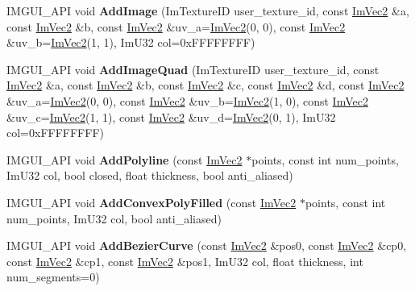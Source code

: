 \begin{DoxyCompactItemize}
I\+M\+G\+U\+I\+\_\+\+A\+PI void {\bfseries Add\+Image} (Im\+Texture\+ID user\+\_\+texture\+\_\+id, const \hyperlink{struct_im_vec2}{Im\+Vec2} \&a, const \hyperlink{struct_im_vec2}{Im\+Vec2} \&b, const \hyperlink{struct_im_vec2}{Im\+Vec2} \&uv\+\_\+a=\hyperlink{struct_im_vec2}{Im\+Vec2}(0, 0), const \hyperlink{struct_im_vec2}{Im\+Vec2} \&uv\+\_\+b=\hyperlink{struct_im_vec2}{Im\+Vec2}(1, 1), Im\+U32 col=0x\+F\+F\+F\+F\+F\+F\+F\+F)
\item 
\mbox{\label{struct_im_draw_list_a1cc1f8d4d1812c65c7887b8d5aef31fe}} 
I\+M\+G\+U\+I\+\_\+\+A\+PI void {\bfseries Add\+Image\+Quad} (Im\+Texture\+ID user\+\_\+texture\+\_\+id, const \hyperlink{struct_im_vec2}{Im\+Vec2} \&a, const \hyperlink{struct_im_vec2}{Im\+Vec2} \&b, const \hyperlink{struct_im_vec2}{Im\+Vec2} \&c, const \hyperlink{struct_im_vec2}{Im\+Vec2} \&d, const \hyperlink{struct_im_vec2}{Im\+Vec2} \&uv\+\_\+a=\hyperlink{struct_im_vec2}{Im\+Vec2}(0, 0), const \hyperlink{struct_im_vec2}{Im\+Vec2} \&uv\+\_\+b=\hyperlink{struct_im_vec2}{Im\+Vec2}(1, 0), const \hyperlink{struct_im_vec2}{Im\+Vec2} \&uv\+\_\+c=\hyperlink{struct_im_vec2}{Im\+Vec2}(1, 1), const \hyperlink{struct_im_vec2}{Im\+Vec2} \&uv\+\_\+d=\hyperlink{struct_im_vec2}{Im\+Vec2}(0, 1), Im\+U32 col=0x\+F\+F\+F\+F\+F\+F\+F\+F)
\item 
\mbox{\label{struct_im_draw_list_a3ca939b6e4b35a93611d2d42d7e20434}} 
I\+M\+G\+U\+I\+\_\+\+A\+PI void {\bfseries Add\+Polyline} (const \hyperlink{struct_im_vec2}{Im\+Vec2} $\ast$points, const int num\+\_\+points, Im\+U32 col, bool closed, float thickness, bool anti\+\_\+aliased)
\item 
\mbox{\label{struct_im_draw_list_a3ba618d0615e410dce9eaa0b80a30126}} 
I\+M\+G\+U\+I\+\_\+\+A\+PI void {\bfseries Add\+Convex\+Poly\+Filled} (const \hyperlink{struct_im_vec2}{Im\+Vec2} $\ast$points, const int num\+\_\+points, Im\+U32 col, bool anti\+\_\+aliased)
\item 
\mbox{\label{struct_im_draw_list_afd2eeeb8ed23b6222513953b03620101}} 
I\+M\+G\+U\+I\+\_\+\+A\+PI void {\bfseries Add\+Bezier\+Curve} (const \hyperlink{struct_im_vec2}{Im\+Vec2} \&pos0, const \hyperlink{struct_im_vec2}{Im\+Vec2} \&cp0, const \hyperlink{struct_im_vec2}{Im\+Vec2} \&cp1, const \hyperlink{struct_im_vec2}{Im\+Vec2} \&pos1, Im\+U32 col, float thickness, int num\+\_\+segments=0)

\end{DoxyCompactItemize}

